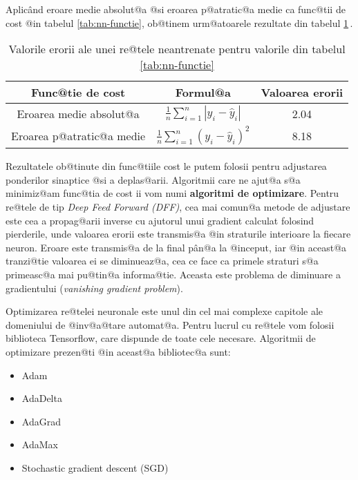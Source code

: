 Aplic\^ and eroare medie absolut@a @si eroarea p@atratic@a medie ca func@tii de cost @in tabelul \ref{tab:nn-functie}, ob@tinem urm@atoarele rezultate din tabelul \ref{tab:nn-erori}\,.

\begin{table}[h]
	\begin{center}
		\begin{tabular}{|c|c|c|}
			\hline
			Func@tie de cost & Formul@a & Valoarea erorii \\
			\hline
			Eroarea medie absolut@a & $\displaystyle\frac{1}{n} \sum_{i=1}^{n} |y_i - \hat{y}_i| $ & 2.04 \\
			\hline
			Eroarea p@atratic@a medie & $\displaystyle\frac{1}{n} \sum_{i=1}^{n} \left( y_i - \hat{y}_i \right)^2 $ & 8.18 \\
			\hline
		\end{tabular}
	\end{center}
	\caption{Valorile erorii ale unei re@tele neantrenate pentru valorile din tabelul \ref{tab:nn-functie}}
	\label{tab:nn-erori}
\end{table}

Rezultatele ob@tinute din func@tiile cost le putem folosii pentru adjustarea ponderilor sinaptice @si a deplas@arii. Algoritmii care ne ajut@a s@a minimiz@am func@tia de cost ii vom numi \textbf{algoritmi de optimizare}. Pentru re@tele de tip \textsl{Deep Feed Forward (DFF)}, cea mai comun@a metode de adjustare este cea a propag@arii inverse cu ajutorul unui gradient calculat folosind pierderile, unde valoarea erorii este transmis@a @in straturile interioare la fiecare neuron. Eroare este transmis@a de la final p\^ an@a la @inceput, iar @in aceast@a tranzi@tie valoarea ei se diminueaz@a, cea ce face ca primele straturi s@a primeasc@a mai pu@tin@a informa@tie. Aceasta este problema de diminuare a gradientului (\textsl{vanishing gradient problem}).

Optimizarea re@telei neuronale este unul din cel mai complexe capitole ale domeniului de @inv@a@tare automat@a. Pentru lucrul cu re@tele vom folosii biblioteca Tensorflow, care dispunde de toate cele necesare. Algoritmii de optimizare prezen@ti @in aceast@a bibliotec@a sunt:

\begin{itemize}
	\item Adam
	\item AdaDelta
	\item AdaGrad
	\item AdaMax
	\item Stochastic gradient descent (SGD)
\end{itemize} 

